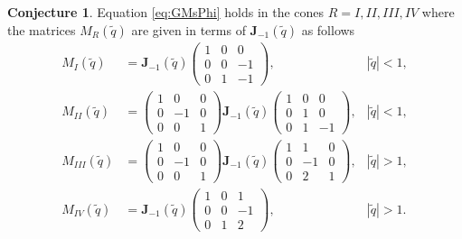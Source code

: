 \documentclass[12pt,reqno]{amsart}
\theoremstyle{definition}
\newtheorem{conjecture}[theorem]{Conjecture}
\def\tq{\tilde{q}}
\def\bJ{\mathbf J}
\begin{document}
\begin{conjecture}
\label{conj-exact-regions}
  Equation \eqref{eq:GMsPhi} holds in the cones $R=I,II,III,IV$ where
  the matrices $M_R(\tq)$ are given in terms of $\bJ_{-1}(\tq)$ as
  follows 
  \begin{subequations}
    \begin{align}
      M_I(\tq) &=
      \bJ_{-1}(\tq)
        \begin{pmatrix}
          1 & 0 & 0\\
          0 & 0 & -1\\
          0 & 1 & -1
        \end{pmatrix}, & |\tq|<1,
                  \label{eq:M1}\\
      M_{II}(\tq) &=
      \begin{pmatrix}
        1 & 0 & 0\\
        0 & -1& 0\\
        0 & 0 & 1
      \end{pmatrix}
                \bJ_{-1}(\tq)
                \begin{pmatrix}
                  1&0&0\\
                  0&1&0\\
                  0&1&-1
                \end{pmatrix}, & |\tq|<1,
                         \label{eq:M2}\\
      M_{III}(\tq) &=
                     \begin{pmatrix}
        1 & 0 & 0\\
        0 & -1& 0\\
        0 & 0 & 1
      \end{pmatrix}
      \bJ_{-1}(\tq)
        \begin{pmatrix}
          1&1&0\\
          0&-1&0\\
          0&2&1
        \end{pmatrix}, & |\tq|>1,
                         \label{eq:M3}\\      
      M_{IV}(\tq) &=
                    \bJ_{-1}(\tq)
    \begin{pmatrix}
      1&0&1\\
      0&0&-1\\
      0&1&2
    \end{pmatrix}, & |\tq| >1.
           \label{eq:M4}
    \end{align}
  \end{subequations}  
\end{conjecture}
\end{document}
